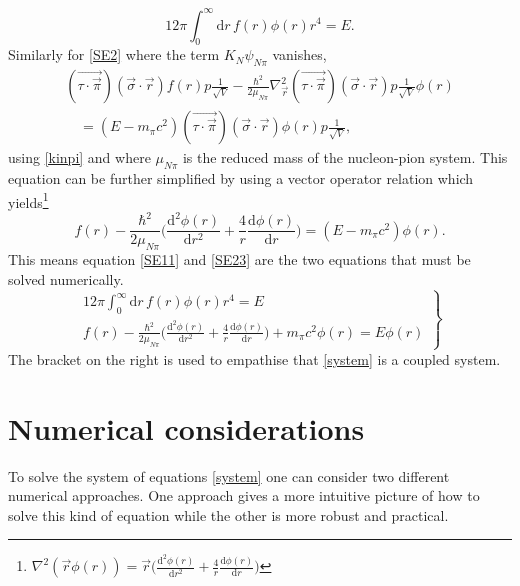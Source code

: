 \begin{equation} \label{SE11}
	12\pi \int_0^\infty  \text{d}r \, f(r) \phi(r) r^4  = E.
\end{equation}
Similarly for \eqref{SE2} where the term $K_{N}\psi_{N\pi}$ vanishes,
\begin{equation}\begin{split}\label{SE22}
		(\vec{\tau\cdot\vec{\pi}})(\vec{\sigma}\cdot\vec{r})f(r) p \frac{1}{\sqrt{V}}-\frac{\hbar^2}{2\mu_{N\pi}} \nabla^2_{\vec{r}}(\vec{\tau\cdot\vec{\pi}})(\vec{\sigma}\cdot\vec{r}) p \frac{1}{\sqrt{V}}\phi(r) \\ \quad= (E-m_\pi c^2) (\vec{\tau\cdot\vec{\pi}})(\vec{\sigma}\cdot\vec{r}) \phi(r)p\frac{1}{\sqrt{V}},
	\end{split}
\end{equation}
using \eqref{kinpi} and where $\mu_{N\pi}$ is the reduced mass of the nucleon-pion system. This equation can be further simplified by using a vector operator relation which yields\footnote{$\nabla^2(\vec{r}\phi(r))=\vec{r}\big(\frac{\text{d}^2\phi(r)}{\text{d}r^2}+\frac{4}{r}\frac{\text{d}\phi(r)}{\text{d}r}\big)$}
\begin{equation} \label{SE23}
	f(r) -\frac{\hbar^2}{2\mu_{N\pi}}\Big(\frac{\text{d}^2 \phi(r)}{\text{d}r^2}+\frac{4}{r}\frac{\text{d}\phi(r)}{\text{d}r}\Big) = (E-m_\pi c^2)\phi(r).
\end{equation}
This means equation \eqref{SE11} and \eqref{SE23} are the two equations that must be solved numerically.
\begin{equation} \label{system}
	\left.
	\begin{array}{ll}
		12\pi \int_0^\infty  \text{d}r \, f(r) \phi(r) r^4  = E \\
		f(r) -\frac{\hbar^2}{2\mu_{N\pi}}\Big(\frac{\text{d}^2 \phi(r)}{\text{d}r^2}+\frac{4}{r}\frac{\text{d}\phi(r)}{\text{d}r}\Big)+m_\pi c^2 \phi(r) = E\phi(r)
	\end{array}
	\right \} 
\end{equation}
The bracket on the right is used to empathise that \eqref{system} is a coupled system.
\section{Numerical considerations}\label{sec:numericalconsiderations}
To solve the system of equations \eqref{system} one can consider two different numerical approaches. One approach gives a more intuitive picture of how to solve this kind of equation while the other is more robust and practical.

